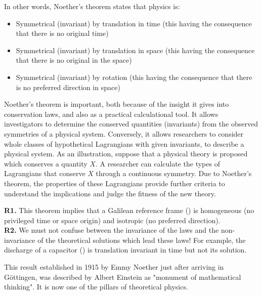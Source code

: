 	In other words, Noether's theorem states that physics is:
	\begin{itemize}
		\item Symmetrical (invariant) by translation in time (this having the consequence that there is no original time)

		\item Symmetrical (invariant) by translation in space (this having the consequence that there is no original in the space)

		\item Symmetrical (invariant) by rotation (this having the consequence that there is no preferred direction in space)
	\end{itemize}
	Noether's theorem is important, both because of the insight it gives into conservation laws, and also as a practical calculational tool. It allows investigators to determine the conserved quantities (invariants) from the observed symmetries of a physical system. Conversely, it allows researchers to consider whole classes of hypothetical Lagrangians with given invariants, to describe a physical system. As an illustration, suppose that a physical theory is proposed which conserves a quantity $X$. A researcher can calculate the types of Lagrangians that conserve $X$ through a continuous symmetry. Due to Noether's theorem, the properties of these Lagrangians provide further criteria to understand the implications and judge the fitness of the new theory.
	
	\begin{tcolorbox}[title=Remarks,colframe=black,arc=10pt]
	\textbf{R1.} This theorem implies that a Galilean reference frame () is homogeneous (no privileged time or space origin) and isotropic (no preferred direction).\\
	
	\textbf{R2.} We must not confuse between the invariance of the laws and the non-invariance of the theoretical solutions which lead these laws! For example, the discharge of a capacitor () is translation invariant in time but not its solution.
	\end{tcolorbox}
	This result established in 1915 by Emmy Noether just after arriving in Göttingen, was described by Albert Einstein as "monument of mathematical thinking". It is now one of the pillars of theoretical physics.

